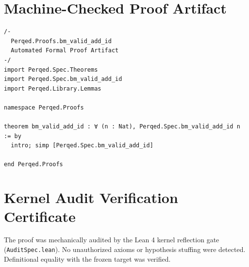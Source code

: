\documentclass[11pt,a4paper]{article}
\begin{document}
\section{Machine-Checked Proof Artifact}
\begin{lstlisting}[language=Lean]
/-
  Perqed.Proofs.bm_valid_add_id
  Automated Formal Proof Artifact
-/
import Perqed.Spec.Theorems
import Perqed.Spec.bm_valid_add_id
import Perqed.Library.Lemmas

namespace Perqed.Proofs

theorem bm_valid_add_id : ∀ (n : Nat), Perqed.Spec.bm_valid_add_id n := by
  intro; simp [Perqed.Spec.bm_valid_add_id]

end Perqed.Proofs
\end{lstlisting}

\section{Kernel Audit Verification Certificate}
The proof was mechanically audited by the Lean 4 kernel reflection gate (\texttt{AuditSpec.lean}). No unauthorized axioms or hypothesis stuffing were detected. Definitional equality with the frozen target was verified.
\end{document}
